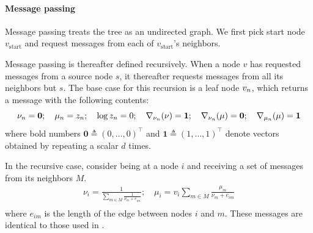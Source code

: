 \paragraph{Message passing} Message
passing treats the tree as an undirected graph. 
We first pick start node $v_{\text{start}}$
and request messages from each of $v_{\text{start}}$'s neighbors.

Message passing is thereafter defined recursively. 
When a node $v$ has requested messages from a source node $s$,
it thereafter requests messages from all its neighbors but $s$.
The base case for this recursion is a leaf node $v_n$,
which returns a message with the following contents:
\begin{equation}
    \nu_n = \bm{0};\quad \mu_n = z_n;\quad \log z_n = 0;\quad \nabla_{\nu_n}(\nu) = \bm{1};\quad \nabla_{\nu_n}(\mu) = \bm{0};\quad \nabla_{\mu_n}(\mu) = \bm{1}
\end{equation}
where bold numbers $\bm{0}\triangleq (0,\ldots,0)^\top$ and $\bm{1}\triangleq (1,\ldots,1)^\top$ denote vectors obtained by repeating a scalar $d$ times.

In the recursive case, consider being at a node $i$ and receiving a set of messages from its neighbors $M$.
\begin{equation}
\begin{split}
    \nu_i = \frac{1}{\sum_{m \in M}\frac{1}{\nu_m + e_{im}}} ;\quad \mu_i = v_i \sum_{m \in M} \frac{\mu_m}{\nu_m + e_{im}}\\
\end{split}
\end{equation}
where $e_{im}$ is the length of the edge between nodes $i$ and $m$.
These messages are identical to those used in \citet{Boyles2012}.

